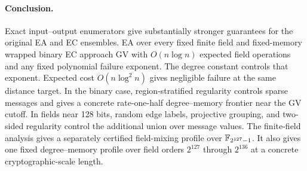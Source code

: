 \paragraph{Conclusion.}
Exact input--output enumerators give substantially stronger guarantees for
the original EA and EC ensembles.  EA over every fixed finite field and
fixed-memory wrapped binary EC approach GV with $O(n\log n)$ expected field
operations and any fixed polynomial failure exponent.  The degree constant
controls that exponent.  Expected cost $O(n\log^2 n)$ gives negligible
failure at the same distance target.
In the binary case, region-stratified
regularity controls sparse messages and gives a concrete rate-one-half
degree--memory frontier near the GV cutoff.  In fields near 128 bits, random
edge labels, projective grouping, and two-sided regularity control the
additional union over message values.  The finite-field analysis gives a
separately certified field-mixing profile over $\mathbb F_{2^{127}-1}$.  It also
gives one fixed degree--memory profile over field orders $2^{127}$ through
$2^{136}$ at a concrete cryptographic-scale length.
